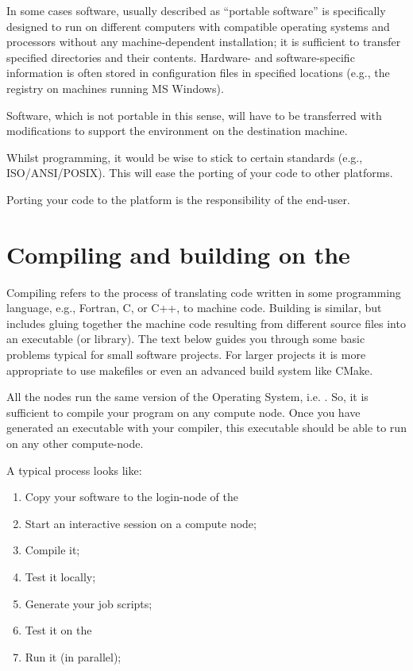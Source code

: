 In some cases software, usually described as ``portable software'' is
specifically designed to run on different computers with compatible operating
systems and processors without any machine-dependent installation; it is
sufficient to transfer specified directories and their contents. Hardware- and
software-specific information is often stored in configuration files in
specified locations (e.g., the registry on machines running MS Windows).

Software, which is not portable in this sense, will have to be transferred with
modifications to support the environment on the destination machine.

Whilst programming, it would be wise to stick to certain standards (e.g.,
ISO/ANSI/POSIX).  This will ease the porting of your code to other platforms.

Porting your code to the \operatingsystem platform is the responsibility of the
end-user.

\section{Compiling and building on the \hpc}

Compiling refers to the process of translating code written in some programming
language, e.g., Fortran, C, or C++, to machine code. Building is similar, but
includes gluing together the machine code resulting from different source files
into an executable (or library). The text below guides you through some basic
problems typical for small software projects. For larger projects it is more
appropriate to use makefiles or even an advanced build system like CMake.

All the \hpc nodes run the same version of the Operating System, i.e.
\operatingsystem. So, it is sufficient to compile your program on any compute
node.  Once you have generated an executable with your compiler, this
executable should be able to run on any other compute-node.

A typical process looks like:

\begin{enumerate}
\item  Copy your software to the login-node of the \hpc
\item  Start an interactive session on a compute node;
\item  Compile it;
\item  Test it locally;
\item  Generate your job scripts;
\item  Test it on the \hpc
\item  Run it (in parallel);
\end{enumerate}

